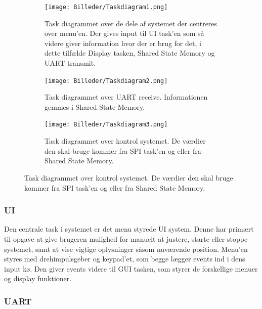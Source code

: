\begin{figure}[h]
\centering
\begin{subfigure}[t]{0.3\textwidth}
	\texttt{[image: Billeder/Taskdiagram1.png]}
	\caption{Task diagrammet over de dele af systemet der centreres over menu'en. Der gives input til UI task'en som så videre giver information hvor der er brug for det, i dette tilfælde Display tasken, Shared State Memory og UART transmit.}
	\label{fig:task1}
    \end{subfigure}
    \begin{subfigure}[t]{0.3\textwidth}
\texttt{[image: Billeder/Taskdiagram2.png]}
	\caption{Task diagrammet over UART receive. Informationen gemmes i Shared State Memory.}
	\label{fig:task2}
    \end{subfigure}
    \begin{subfigure}[t]{0.3\textwidth}
	\texttt{[image: Billeder/Taskdiagram3.png]}
	\caption{Task diagrammet over kontrol systemet. De værdier den skal bruge kommer fra SPI task'en og eller fra Shared State Memory.}
	\label{fig:task3}
    \end{subfigure}
\label{fig:taskdiagram}
\end{figure}


\subsubsection{UI}

Den centrale task i systemet er det menu styrede UI system. Denne har primært til opgave at give brugeren mulighed for manuelt at justere, starte eller stoppe systemet, samt at vise vigtige oplysninger såsom nuværende position. Menu'en styres med drehimpulsgeber og keypad'et, som begge lægger events ind i dens input kø. Den giver events videre til GUI tasken, som styrer de forskellige menuer og display funktioner.



\subsubsection{UART}

